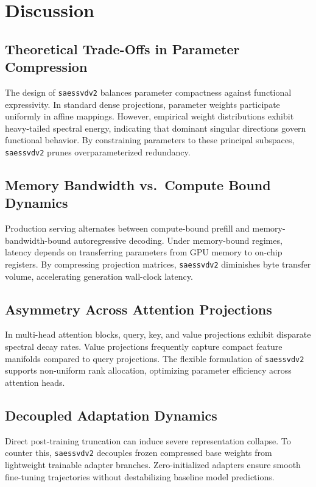 \section{Discussion}

\subsection{Theoretical Trade-Offs in Parameter Compression}
The design of \texttt{saessvdv2} balances parameter compactness against functional expressivity. In standard dense projections, parameter weights participate uniformly in affine mappings. However, empirical weight distributions exhibit heavy-tailed spectral energy, indicating that dominant singular directions govern functional behavior. By constraining parameters to these principal subspaces, \texttt{saessvdv2} prunes overparameterized redundancy.

\subsection{Memory Bandwidth vs.\ Compute Bound Dynamics}
Production serving alternates between compute-bound prefill and memory-bandwidth-bound autoregressive decoding. Under memory-bound regimes, latency depends on transferring parameters from GPU memory to on-chip registers. By compressing projection matrices, \texttt{saessvdv2} diminishes byte transfer volume, accelerating generation wall-clock latency.

\subsection{Asymmetry Across Attention Projections}
In multi-head attention blocks, query, key, and value projections exhibit disparate spectral decay rates. Value projections frequently capture compact feature manifolds compared to query projections. The flexible formulation of \texttt{saessvdv2} supports non-uniform rank allocation, optimizing parameter efficiency across attention heads.

\subsection{Decoupled Adaptation Dynamics}
Direct post-training truncation can induce severe representation collapse. To counter this, \texttt{saessvdv2} decouples frozen compressed base weights from lightweight trainable adapter branches. Zero-initialized adapters ensure smooth fine-tuning trajectories without destabilizing baseline model predictions.

